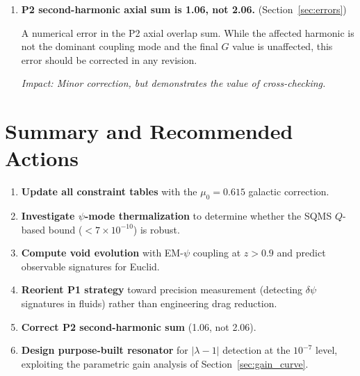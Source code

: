 \documentclass[11pt,twocolumn]{article}
\newcommand{\dpsi}{\delta\psi}
\newcommand{\lam}{\lambda}
\begin{document}
\begin{enumerate}
\emph{Impact: Reorients P1 strategy toward detection rather than application.}

\item \textbf{P2 second-harmonic axial sum is 1.06, not 2.06.}
(Section~\ref{sec:errors})

A numerical error in the P2 axial overlap sum. While the affected
harmonic is not the dominant coupling mode and the final $G$ value
is unaffected, this error should be corrected in any revision.

\emph{Impact: Minor correction, but demonstrates the value of
cross-checking.}

\end{enumerate}


\section{Summary and Recommended Actions}
\label{sec:summary}

\begin{enumerate}
\item \textbf{Update all constraint tables} with the $\mu_0 = 0.615$
galactic correction.
\item \textbf{Investigate $\psi$-mode thermalization} to determine
whether the SQMS $Q$-based bound ($< 7\times10^{-10}$) is robust.
\item \textbf{Compute void evolution} with EM-$\psi$ coupling at
$z > 0.9$ and predict observable signatures for Euclid.
\item \textbf{Reorient P1 strategy} toward precision measurement
(detecting $\dpsi$ signatures in fluids) rather than engineering
drag reduction.
\item \textbf{Correct P2 second-harmonic sum} (1.06, not 2.06).
\item \textbf{Design purpose-built resonator} for $|\lam-1|$ detection
at the $10^{-7}$ level, exploiting the parametric gain analysis
of Section~\ref{sec:gain_curve}.
\end{enumerate}
\end{document}
